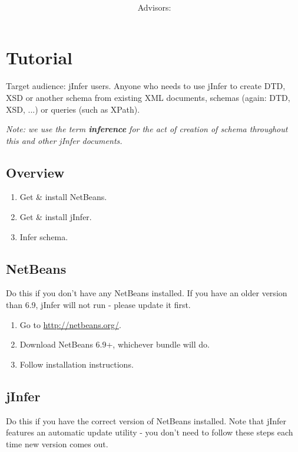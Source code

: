 \documentclass[a4paper,10pt,oneside]{article}
\title{\bf\mftitle}
\author{\mfauthor \\ Advisors: \mfadvisor}
\date{\mfplacedate}
\begin{document}
\maketitle


 \section*{Tutorial}
        \par 
          Target audience: jInfer users. Anyone who needs to use jInfer to create DTD, XSD or another schema from existing XML documents, schemas (again: DTD, XSD, ...) or queries (such as XPath).
        
        \par 
          \emph{Note: we use the term \textbf{inference} for the act of creation of schema throughout this and other jInfer documents.}
        
\subsection*{Overview}
\begin{enumerate}
  \item Get \& install NetBeans.
  \item Get \& install jInfer.
  \item Infer schema.
\end{enumerate}
\subsection*{NetBeans}
\par 
  Do this if you don't have any NetBeans installed. If you have an older version than 6.9, jInfer will not run - please update it first.

\begin{enumerate}
  \item Go to \url{http://netbeans.org/}.
  \item Download NetBeans 6.9+, whichever bundle will do.
  \item Follow installation instructions.
  
\end{enumerate}
\subsection*{jInfer}
\par 
  Do this if you have the correct version of NetBeans installed. Note that jInfer features an automatic update utility - you don't need to follow these steps each time new version comes out.
\end{document}
